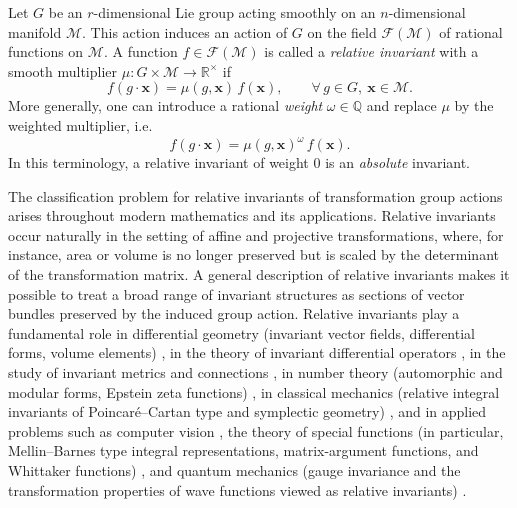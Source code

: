 \documentclass[12pt,reqno]{amsart}
\begin{document}
Let $G$ be an $r$-dimensional Lie group acting smoothly on an $n$-dimensional manifold $\mathcal M$.
This action induces an action of $G$ on the field $\mathcal F(\mathcal M)$ of rational functions on $\mathcal M$.
A function $f\in\mathcal F(\mathcal M)$ is called a \emph{relative invariant} with a smooth multiplier
$\mu:G\times\mathcal M\to\mathbb R^\times$ if
\begin{equation}\label{m_oz}
f(g\cdot \boldsymbol x)=\mu(g,\boldsymbol x)\,f(\boldsymbol x),\qquad \forall\, g\in G,\ \boldsymbol x\in\mathcal M.
\end{equation}
More generally, one can introduce a rational \emph{weight} $\omega\in\mathbb Q$ and replace $\mu$ by the weighted
multiplier, i.e.
\[
f(g\cdot\boldsymbol x)=\mu(g,\boldsymbol x)^{\omega}\,f(\boldsymbol x).
\]
In this terminology, a relative invariant of weight $0$ is an \emph{absolute} invariant.

The classification problem for relative invariants of transformation group actions arises throughout modern
mathematics and its applications. Relative invariants occur naturally in the setting of affine and projective
transformations, where, for instance, area or volume is no longer preserved but is scaled by the determinant of
the transformation matrix. A general description of relative invariants makes it possible to treat a broad range
of invariant structures as sections of vector bundles preserved by the induced group action.
Relative invariants play a fundamental role in differential geometry (invariant vector fields, differential forms,
volume elements) \cite{Graustein, Olver1997, Olver2007, Bott}, in the theory of invariant differential operators
\cite{Helgason}, in the study of invariant metrics and connections \cite{KobayashiNomizu}, in number theory
(automorphic and modular forms, Epstein zeta functions) \cite{Langlands, Miyake}, in classical mechanics
(relative integral invariants of Poincar\'e--Cartan type and symplectic geometry) \cite{AbrahamMarsden, Arnold},
and in applied problems such as computer vision \cite{Olver2023, Wang, Open}, the theory of special functions
(in particular, Mellin--Barnes type integral representations, matrix-argument functions, and Whittaker functions)
\cite{Miller, VilenkinKlimyk}, and quantum mechanics (gauge invariance and the transformation properties of wave
functions viewed as relative invariants) \cite{Weyl}.
\end{document}
